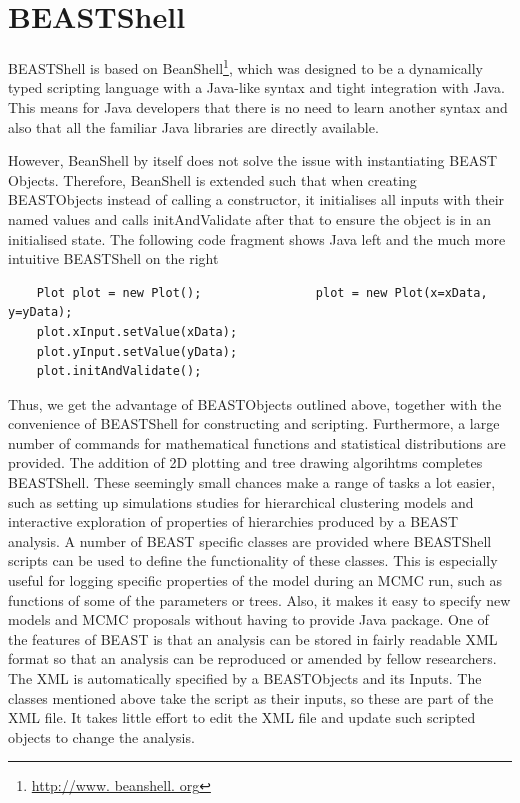 \documentclass[twoside,11pt]{article}
\begin{document}
\section{BEASTShell}

BEASTShell is based on BeanShell\footnote{\url{http://www. beanshell. org}}, which was
designed to be a dynamically typed scripting language with a Java-like syntax and
tight integration with Java. This means for Java developers that there is no need to learn 
another syntax and also that all the familiar Java libraries are directly available.

However, BeanShell by itself does not solve the issue with instantiating BEAST Objects.
Therefore, BeanShell is extended such that when creating BEASTObjects instead of calling
a constructor, it initialises all inputs with their named values and calls initAndValidate
after that to ensure the object is in an initialised state. 
The following code fragment shows Java left and the much more intuitive BEASTShell on the 
right
\begin{verbatim}
	Plot plot = new Plot();                plot = new Plot(x=xData, y=yData);
	plot.xInput.setValue(xData);
	plot.yInput.setValue(yData);
	plot.initAndValidate();
\end{verbatim}
Thus, we get the advantage
of BEASTObjects outlined above, together with the convenience of BEASTShell for constructing 
and scripting. Furthermore, a large number of commands for mathematical functions and 
statistical distributions are provided. The addition of 2D plotting and tree drawing 
algorihtms completes BEASTShell.
%
These seemingly small chances make a range of tasks a lot easier, such as
setting up simulations studies for hierarchical clustering models and
interactive exploration of properties of hierarchies produced by a BEAST 
analysis. A number of BEAST specific classes are provided where BEASTShell scripts
can be used to define the functionality of these classes. This is especially useful
for logging specific properties of the model during an MCMC run, such as functions
of some of the parameters or trees. Also, it makes it easy to specify new models 
and MCMC proposals without having to provide Java package. One of the features of BEAST
is that an analysis can be stored in fairly readable XML format so that an analysis can
be reproduced or amended by fellow researchers. The XML is automatically specified
by a BEASTObjects and its Inputs. The classes mentioned above take the script
as their inputs, so these are part of the XML file. It takes little effort to edit
the XML file and update such scripted objects to change the analysis.
\end{document}
